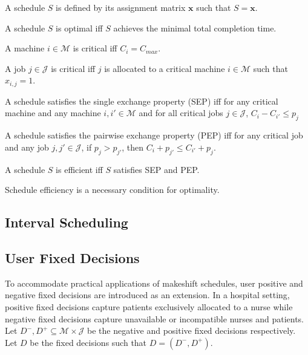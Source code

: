 \begin{definition}
	A schedule $S$ is defined by its assignment matrix $\mathbf{x}$ such that $S=\mathbf{x}$.
\end{definition}

\begin{definition}
	A schedule $S$ is optimal iff $S$ achieves the minimal total completion time.
\end{definition}


\begin{definition}
	A machine $i\in\mathcal{M}$ is critical iff $C_i=C_{max}$.
\end{definition}

\begin{definition}
	A job $j\in\mathcal{J}$ is critical iff $j$ is allocated to a critical machine $i\in\mathcal{M}$ such that $x_{i,j}=1$.
\end{definition}

\begin{definition}
	A schedule satisfies the single exchange property (SEP) iff for any critical machine and any machine $i,i'\in\mathcal{M}$ and for all critical jobs $j\in\mathcal{J}$, $C_i-C_{i'}\leq p_j$
\end{definition}

\begin{definition}
	A schedule satisfies the pairwise exchange property (PEP) iff for any critical job and any job $j,j'\in\mathcal{J}$, if $p_j>p_{j'}$, then $C_i+p_{j'}\leq C_{i'}+p_j$.
\end{definition}

\begin{definition}
	A schedule $S$ is efficient iff $S$ satisfies SEP and PEP.
\end{definition}

\begin{theorem}
	Schedule efficiency is a necessary condition for optimality.
\end{theorem}

\subsection{Interval Scheduling}

\subsection{User Fixed Decisions}

To accommodate practical applications of makeshift schedules, user positive and negative fixed decisions are introduced as an extension. In a hospital setting, positive fixed decisions capture patients exclusively allocated to a nurse while negative fixed decisions capture unavailable or incompatible nurses and patients. Let $D^-,D^+\subseteq\mathcal{M}\times\mathcal{J}$ be the negative and positive fixed decisions respectively. Let $D$ be the fixed decisions such that $D=(D^-,D^+)$.

